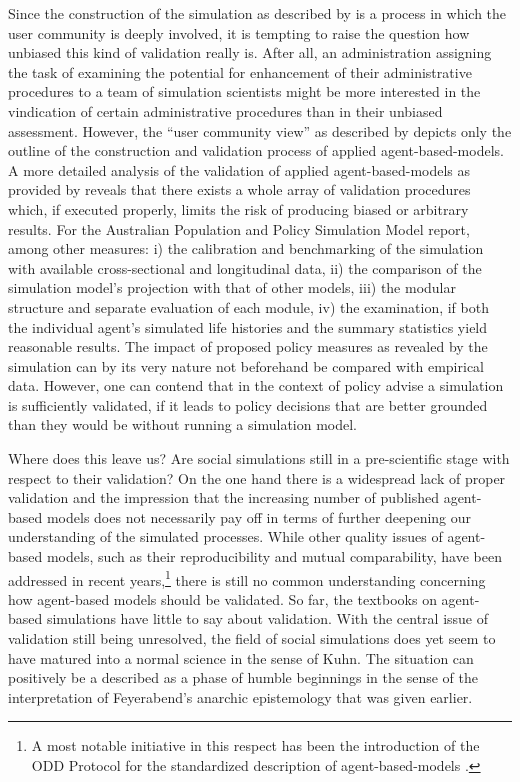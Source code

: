 \documentclass[12pt, a4paper]{article}
\begin{document}
Since the construction of the simulation as described by
\citet[section 2.4]{ahrweiler-gilbert:2015} is a process in which the
user community is deeply involved, it is tempting to raise the
question how unbiased this kind of validation really is. After all, an
administration assigning the task of examining the potential for
enhancement of their administrative procedures to a team of simulation
scientists might be more interested in the vindication of certain
administrative procedures than in their unbiased assessment. However,
the ``user community view'' as described by
\citet{ahrweiler-gilbert:2015} depicts only the outline of the
construction and validation process of applied agent-based-models. A
more detailed analysis of the validation of applied agent-based-models
as provided by \citet{harding-et-al:2010} reveals that there exists a
whole array of validation procedures which, if executed properly,
limits the risk of producing biased or arbitrary results. For the
Australian Population and Policy Simulation Model
\citet{harding-et-al:2010} report, among other measures: i) the
calibration and benchmarking of the simulation with available
cross-sectional and longitudinal data, ii) the comparison of the
simulation model's projection with that of other models, iii) the
modular structure and separate evaluation of each module, iv) the
examination, if both the individual agent's simulated life histories
and the summary statistics yield reasonable results. The impact of
proposed policy measures as revealed by the simulation can by its very
nature not beforehand be compared with empirical data. However, one
can contend that in the context of policy advise a simulation is
sufficiently validated, if it leads to policy decisions that are
better grounded than they would be without running a simulation model.

Where does this leave us? Are social simulations still in a
pre-scientific stage with respect to their validation? On the one hand
there is a widespread lack of proper validation and the impression
that the increasing number of published agent-based models does not
necessarily pay off in terms of further deepening our understanding of
the simulated processes. While other quality issues of agent-based
models, such as their reproducibility and mutual comparability, have
been addressed in recent years,\footnote{A most notable initiative in
this respect has been the introduction of the ODD Protocol for the
standardized description of agent-based-models
\citep{railsback-grimm:2012}.} there is still no common understanding
concerning how agent-based models should be validated. So far, the
textbooks on agent-based simulations have little to say about
validation. With the central issue of validation still being
unresolved, the field of social simulations does yet seem to have
matured into a normal science in the sense of Kuhn. The situation can
positively be a described as a phase of humble beginnings in the sense
of the interpretation of Feyerabend's anarchic epistemology that was
given earlier.
\end{document}

